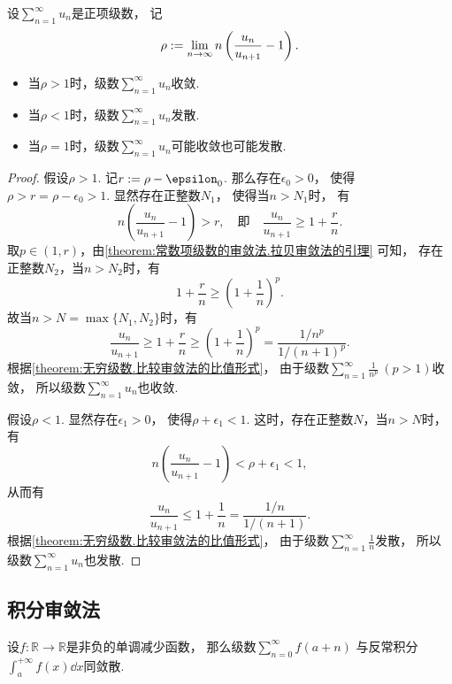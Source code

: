 \begin{theorem}[拉贝审敛法]
设\(\sum_{n=1}^\infty u_n\)是正项级数，
记\[
	\rho := \lim_{n\to\infty} n \left(\frac{u_n}{u_{n+1}} - 1\right).
\]
\begin{itemize}
	\item 当\(\rho>1\)时，级数\(\sum_{n=1}^\infty u_n\)收敛.
	\item 当\(\rho<1\)时，级数\(\sum_{n=1}^\infty u_n\)发散.
	\item 当\(\rho=1\)时，级数\(\sum_{n=1}^\infty u_n\)可能收敛也可能发散.
\end{itemize}
\begin{proof}
假设\(\rho>1\).
记\(r \defeq \rho-\epsilon_0\).
那么存在\(\epsilon_0>0\)，
使得\(\rho>r=\rho-\epsilon_0>1\).
显然存在正整数\(N_1\)，
使得当\(n>N_1\)时，
有\[
	n \left(\frac{u_n}{u_{n+1}}-1\right) > r,
	\quad\text{即}\quad
	\frac{u_n}{u_{n+1}} \geq 1+\frac{r}{n}.
\]
取\(p\in(1,r)\)，由\cref{theorem:常数项级数的审敛法.拉贝审敛法的引理} 可知，
存在正整数\(N_2\)，当\(n>N_2\)时，有\[
	1+\frac{r}{n} \geq \left(1+\frac1n\right)^p.
\]
故当\(n>N=\max\{N_1,N_2\}\)时，有\[
	\frac{u_n}{u_{n+1}}
	\geq 1+\frac{r}{n}
	\geq \left(1+\frac1n\right)^p
	= \frac{1/n^p}{1/(n+1)^p}.
\]
根据\cref{theorem:无穷级数.比较审敛法的比值形式}，
由于级数\(\sum_{n=1}^\infty \frac1{n^p}\ (p>1)\)收敛，
所以级数\(\sum_{n=1}^\infty u_n\)也收敛.

假设\(\rho<1\).
显然存在\(\epsilon_1>0\)，
使得\(\rho+\epsilon_1<1\).
这时，存在正整数\(N\)，当\(n>N\)时，有\[
	n \left(\frac{u_n}{u_{n+1}}-1\right)
	< \rho+\epsilon_1
	< 1,
\]
从而有\[
	\frac{u_n}{u_{n+1}}
	\leq 1+\frac1n
	= \frac{1/n}{1/(n+1)}.
\]
根据\cref{theorem:无穷级数.比较审敛法的比值形式}，
由于级数\(\sum_{n=1}^\infty \frac1n\)发散，
所以级数\(\sum_{n=1}^\infty u_n\)也发散.
\end{proof}
\end{theorem}

\subsection{积分审敛法}
\begin{theorem}[积分审敛法]\label{theorem:无穷级数.积分审敛法}
设\(f\colon \mathbb{R}\to\mathbb{R}\)是非负的单调减少函数，
那么级数\(\sum_{n=0}^\infty f(a+n)\)
与反常积分\(\int_a^{+\infty} f(x) \dd{x}\)同敛散.
\end{theorem}
